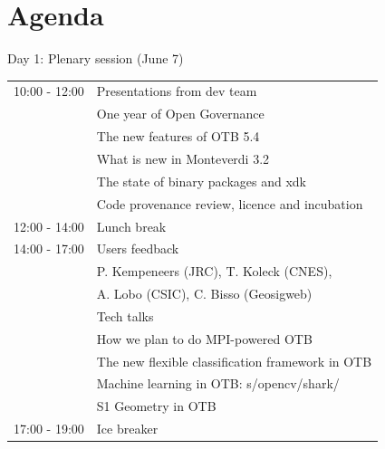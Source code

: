 \documentclass[smaller]{beamer}
\begin{document}
\section{Agenda}
\label{sec:orgheadline13}
\begin{frame}[label={sec:orgheadline10}]{Day 1: Plenary session (June 7)}
\begin{center}
\begin{tabular}{ll}
\hline
10:00 - 12:00 & \alert{Presentations from dev team}\\
 & One year of Open Governance\\
 & The new features of OTB 5.4\\
 & What is new in Monteverdi 3.2\\
 & The state of binary packages and xdk\\
 & Code provenance review, licence and incubation\\
\hline
12:00 - 14:00 & \alert{Lunch break}\\
\hline
14:00 - 17:00 & \alert{Users feedback}\\
 & P. Kempeneers (JRC), T. Koleck (CNES),\\
 & A. Lobo (CSIC), C. Bisso (Geosigweb)\\
 & \alert{Tech talks}\\
 & How we plan to do MPI-powered OTB\\
 & The new flexible classification framework in OTB\\
 & Machine learning in OTB: s/opencv/shark/\\
 & S1 Geometry in OTB\\
\hline
17:00 - 19:00 & \alert{Ice breaker}\\
\hline
\end{tabular}
\end{center}
\end{frame}
\end{document}
